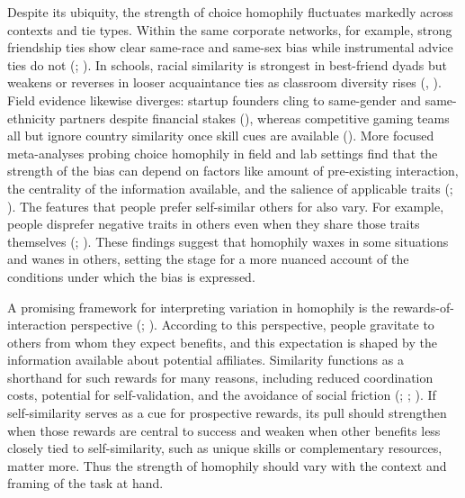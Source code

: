\documentclass[
  man,
  floatsintext,
  longtable,
  nolmodern,
  notxfonts,
  notimes,
  draftfirst,
  colorlinks=true,linkcolor=blue,citecolor=blue,urlcolor=blue]{apa7}
\begin{document}
Despite its ubiquity, the strength of choice homophily fluctuates
markedly across contexts and tie types. Within the same corporate
networks, for example, strong friendship ties show clear same-race and
same-sex bias while instrumental advice ties do not
(;
). In schools,
racial similarity is strongest in best-friend dyads but weakens or
reverses in looser acquaintance ties as classroom diversity rises
(,
). Field evidence likewise
diverges: startup founders cling to same-gender and same-ethnicity
partners despite financial stakes (), whereas competitive gaming teams all but ignore country
similarity once skill cues are available
(). More
focused meta-analyses probing choice homophily in field and lab settings
find that the strength of the bias can depend on factors like amount of
pre-existing interaction, the centrality of the information available,
and the salience of applicable traits
(;
). The features
that people prefer self-similar others for also vary. For example,
people disprefer negative traits in others even when they share those
traits themselves (;
). These
findings suggest that homophily waxes in some situations and wanes in
others, setting the stage for a more nuanced account of the conditions
under which the bias is expressed.

A promising framework for interpreting variation in homophily is the
rewards-of-interaction perspective
(;
).
According to this perspective, people gravitate to others from whom they
expect benefits, and this expectation is shaped by the information
available about potential affiliates. Similarity functions as a
shorthand for such rewards for many reasons, including reduced
coordination costs, potential for self-validation, and the avoidance of
social friction (;
;
). If
self-similarity serves as a cue for prospective rewards, its pull should
strengthen when those rewards are central to success and weaken when
other benefits less closely tied to self-similarity, such as unique
skills or complementary resources, matter more. Thus the strength of
homophily should vary with the context and framing of the task at hand.
\end{document}
